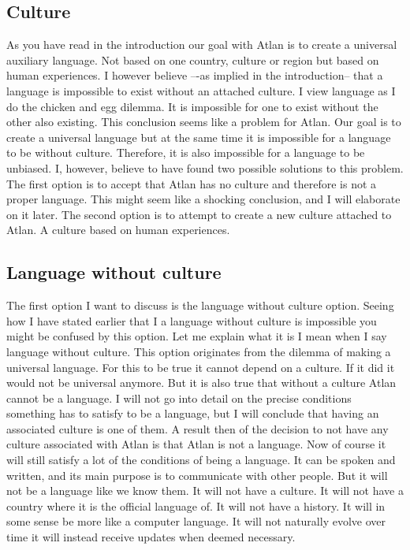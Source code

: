 \subsection{Culture}

\noindent As you have read in the introduction our goal with Atlan is to create a universal auxiliary language. Not based on one country, culture or region but based on human experiences. I however believe –-as implied in the introduction-- that a language is impossible to exist without an attached culture. I view language as I do the chicken and egg dilemma. It is impossible for one to exist without the other also existing. This conclusion seems like a problem for Atlan. Our goal is to create a universal language but at the same time it is impossible for a language to be without culture. Therefore, it is also impossible for a language to be unbiased. I, however, believe to have found  two possible solutions to this problem. The first option is to accept that Atlan has no culture and therefore is not a proper language. This might seem like a shocking conclusion, and I will elaborate on it later. The second option is to attempt to create a new culture attached to Atlan. A culture based on human experiences.  

\subsection{Language without culture} 

\noindent The first option I want to discuss is the language without culture option. Seeing how I have stated earlier that I a language without culture is impossible you might be confused by this option. Let me explain what it is I mean when I say language without culture. This option originates from the dilemma of making a universal language. For this to be true it cannot depend on a culture. If it did it would not be universal anymore. But it is also true that without a culture Atlan cannot be a language. I will not go into detail on the precise conditions something has to satisfy to be a language, but I will conclude that having an associated culture is one of them. A result then of the decision to not have any culture associated with Atlan is that Atlan is not a language. Now of course it will still satisfy a lot of the conditions of being a language. It can be spoken and written, and its main purpose is to communicate with other people. But it will not be a language like we know them. It will not have a culture. It will not have a country where it is the official language of. It will not have a history. It will in some sense be more like a computer language. It will not naturally evolve over time it will instead receive updates when deemed necessary.  

